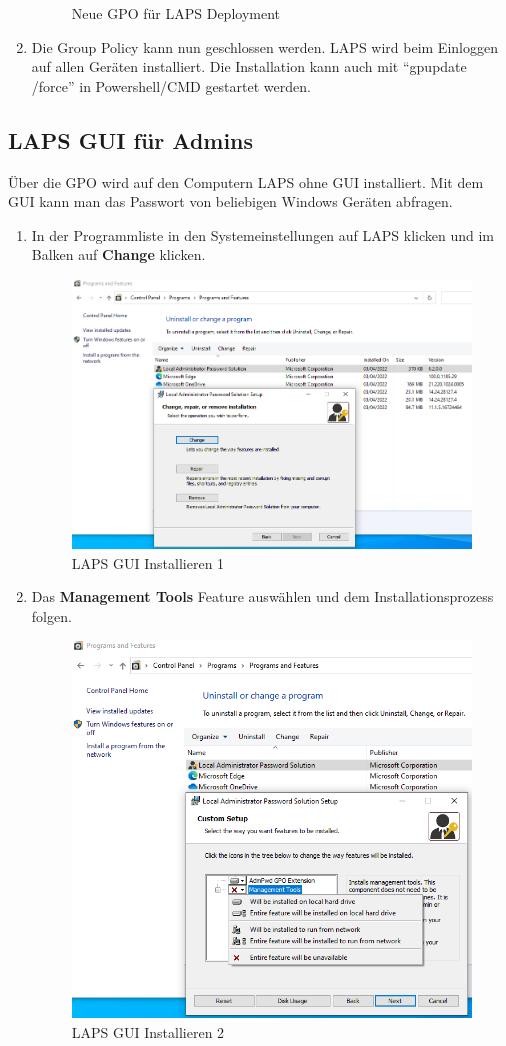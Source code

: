 \begin{enumerate}
\begin{figure}[H]
        \caption{Neue GPO für LAPS Deployment}
    \end{figure}
\item Die Group Policy kann nun geschlossen werden. LAPS wird beim Einloggen auf allen Geräten installiert. Die Installation kann auch mit ``gpupdate /force'' in Powershell/CMD gestartet werden.
\end{enumerate}

\subsection{LAPS GUI für Admins}
Über die GPO wird auf den Computern LAPS ohne GUI installiert.
Mit dem GUI kann man das Passwort von beliebigen Windows Geräten abfragen.

\begin{enumerate}
    \item In der Programmliste in den Systemeinstellungen auf LAPS klicken und im Balken auf \textbf{Change} klicken.
    \begin{figure}[H]
        \centering
        \includegraphics[width=0.7\linewidth]{../img/LAPS/laps-ui-install.png}
        \caption{LAPS GUI Installieren 1}
    \end{figure}

    \item Das \textbf{Management Tools} Feature auswählen und dem Installationsprozess folgen.
    \begin{figure}[H]
        \centering
        \includegraphics[width=0.7\linewidth]{../img/LAPS/laps-ui-install-2.png}
        \caption{LAPS GUI Installieren 2}
    \end{figure}
\end{enumerate}

